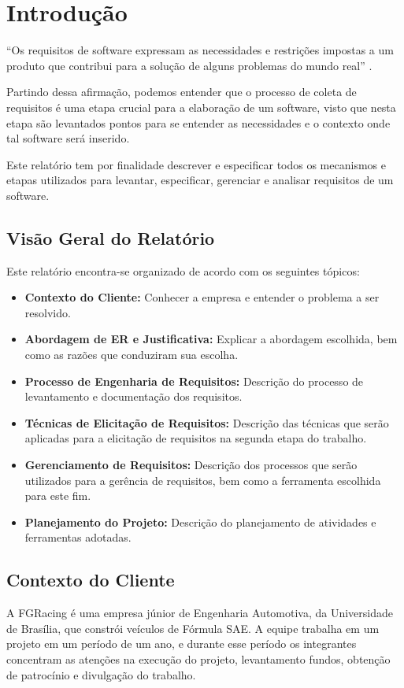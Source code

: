 
\chapter[Introdução]{Introdução}

“Os requisitos de software expressam as necessidades e restrições impostas a um
produto que contribui para a solução de alguns problemas do mundo real” \cite{swebok2004}.

Partindo dessa afirmação, podemos entender que o processo de coleta de requisitos
é uma etapa crucial para a elaboração de um software, visto que nesta etapa são
levantados pontos para se entender as necessidades e o contexto onde tal software será inserido.

Este relatório tem por finalidade descrever e especificar todos os mecanismos e
etapas utilizados para levantar, especificar, gerenciar e analisar requisitos de um software.

\section{Visão Geral do Relatório}

Este relatório encontra-se organizado de acordo com os seguintes tópicos:

\begin{itemize}
		\item \textbf{Contexto do Cliente:} Conhecer a empresa e entender o problema a ser resolvido.
		\item \textbf{Abordagem de ER e Justificativa:} Explicar a abordagem escolhida, bem como as razões que
		conduziram sua escolha.
		\item \textbf{Processo de Engenharia de Requisitos:} Descrição do processo de levantamento e documentação
		dos requisitos.
		\item \textbf{Técnicas de Elicitação de Requisitos:} Descrição das técnicas que serão aplicadas para
		a elicitação de requisitos na segunda etapa do trabalho.
		\item \textbf{Gerenciamento de Requisitos:} Descrição dos processos que serão utilizados para a gerência
		de requisitos, bem como a ferramenta escolhida para este fim.
		\item \textbf{Planejamento do Projeto:} Descrição do planejamento de atividades e ferramentas adotadas.
\end{itemize}


\section{Contexto do Cliente}
A FGRacing é uma empresa júnior de Engenharia Automotiva, da Universidade de Brasília,
que constrói veículos de Fórmula SAE. A equipe trabalha em um projeto em um período de um ano,
e durante esse período os integrantes concentram as atenções na execução do projeto, levantamento fundos,
obtenção de patrocínio e divulgação do trabalho.

